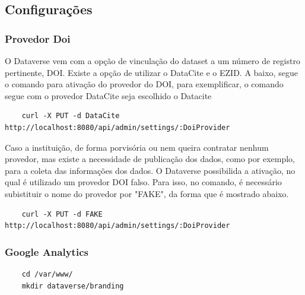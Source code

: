 \documentclass[12pt,hidelinks]{article}
\begin{document}
        \subsection{Configurações}
        
        \subsubsection{Provedor Doi }
        
    \qquad O Dataverse vem com a opção de vinculação do dataset a um número de registro pertinente, DOI. Existe a opção de utilizar o DataCite e o EZID. A baixo, segue o comando para ativação do provedor do DOI, para exemplificar, o comando segue com o provedor DataCite seja escolhido o Datacite
        \begin{verbatim}
    curl -X PUT -d DataCite http://localhost:8080/api/admin/settings/:DoiProvider
        \end{verbatim}
        
        Caso a instituição, de forma porvisória ou nem queira contratar nenhum provedor, mas existe a necessidade de publicação dos dados, como por exemplo, para a coleta das informações dos dados. O Dataverse possibilida a ativação, no qual é utilizado um provedor DOI falso. Para isso, no comando, é necessário subistituir o nome do provedor por "FAKE", da forma que é mostrado abaixo.
        
        \begin{verbatim}
    curl -X PUT -d FAKE http://localhost:8080/api/admin/settings/:DoiProvider
        \end{verbatim}
        
               


        \subsubsection{Google Analytics}
        
        
        \begin{verbatim}
    cd /var/www/
    mkdir dataverse/branding
        \end{verbatim}
        
\end{document}
